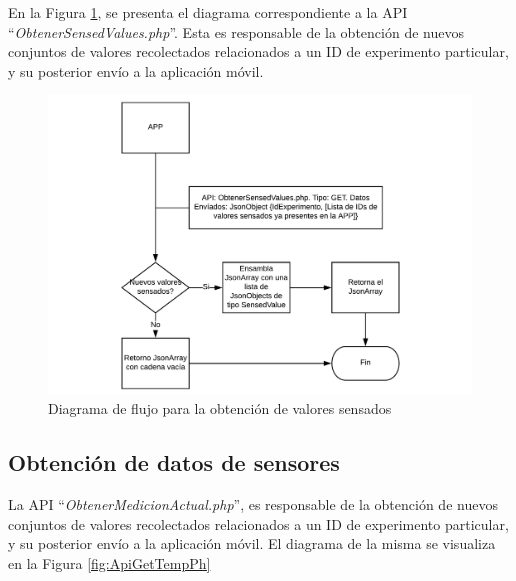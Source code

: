         \par En la Figura \ref{fig:ApiGet}, se presenta el diagrama correspondiente a la API ``\textit{ObtenerSensedValues.php}''. Esta es responsable de la obtención de nuevos conjuntos de valores recolectados relacionados a un ID de experimento particular, y su posterior envío a la aplicación móvil.
            \begin{figure}[h]
                \centering
                \includegraphics [scale=0.5] {DiagramaAPIGet.pdf}
                \caption{Diagrama de flujo para la obtención de valores sensados}
                \label{fig:ApiGet}
            \end{figure}
        
        \subsection{Obtención de datos de sensores}
        \par La API ``\textit{ObtenerMedicionActual.php}'', es responsable de la obtención de nuevos conjuntos de valores recolectados relacionados a un ID de experimento particular, y su posterior envío a la aplicación móvil. El diagrama de la misma se visualiza en la Figura \ref{fig:ApiGetTempPh}
        
